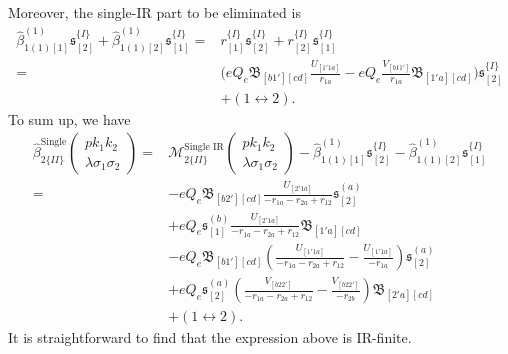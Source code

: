 Moreover, the single-IR part to be eliminated is
\begin{align}
\hat{\beta}^{(1)}_{1(1)[1]}\mathfrak{s}^{\{I\}}_{[2]}+\hat{\beta}^{(1)}_{1(1)[2]}\mathfrak{s}^{\{I\}}_{[1]}=&r^{\{I\}}_{[1]}\mathfrak{s}^{\{I\}}_{[2]}+r^{\{I\}}_{[2]}\mathfrak{s}^{\{I\}}_{[1]}\nonumber\\
=&\biggl( eQ_e\mathfrak{B}_{[b1'][cd]}\frac{U_{[1'1a]}}{r_{1a}} -eQ_e\frac{V_{[b11']}}{r_{1a}}\mathfrak{B}_{[1'a][cd]}  \biggr)\mathfrak{s}_{[2]}^{\{I\}}\nonumber\\
&+(1\leftrightarrow 2).
\end{align}
To sum up, we have
\begin{align}
\hat{\beta}^\text{Single}_{2\{II\}}\left(\begin{array}{c}
pk_1k_2\\\lambda\sigma_1\sigma_2
\end{array}\right)=&\mathcal{M}^\text{Single IR}_{2\{II\}}\left(\begin{array}{c}
pk_1k_2\\\lambda\sigma_1\sigma_2
\end{array}\right)-\hat{\beta}^{(1)}_{1(1)[1]}\mathfrak{s}^{\{I\}}_{[2]}-\hat{\beta}^{(1)}_{1(1)[2]}\mathfrak{s}^{\{I\}}_{[1]}\nonumber\\
=&-eQ_e\mathfrak{B}_{[b2'][cd]}\frac{U_{[2'1a]}}{-r_{1a}-r_{2a}+r_{12}}\mathfrak{s}^{(a)}_{[2]}\nonumber\\
&+eQ_e\mathfrak{s}^{(b)}_{[1]}\frac{U_{[2'1a]}}{-r_{1a}-r_{2a}+r_{12}}\mathfrak{B}_{[1'a][cd]}\nonumber\\
&-eQ_e\mathfrak{B}_{[b1'][cd]}\left(\frac{U_{[1'1a]}}{-r_{1a}-r_{2a}+r_{12}}-\frac{U_{[1'1a]}}{-r_{1a}}\right)\mathfrak{s}^{(a)}_{[2]}\nonumber\\
&+eQ_e\mathfrak{s}^{(a)}_{[2]}\left(\frac{V_{[b22']}}{-r_{1a}-r_{2a}+r_{12}}-\frac{V_{[b22']}}{-r_{2b}}\right)\mathfrak{B}_{[2'a][cd]}\nonumber\\
&+(1\leftrightarrow 2).
\end{align}
It is straightforward to find that the expression above is IR-finite.

